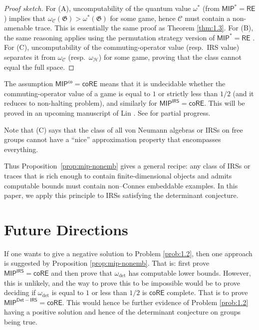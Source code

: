 \documentclass[pdflatex,sn-mathphys-num]{sn-jnl}%
\begin{document}
\begin{proof}[Proof sketch]
For (A), uncomputability of the quantum value $\omega^*$ (from $\mathsf{MIP}^*=\mathsf{RE}$\cite{ji_mipre_2022}) implies that $\omega_\mathcal{C}(\mathfrak{G})>\omega^*(\mathfrak{G})$ for some game, hence $\mathcal{C}$ must contain a non-amenable trace. This is essentially the same proof as Theorem \ref{thm:1.3}. 
For (B), the same reasoning applies using the permutation strategy version of $\mathsf{MIP}^*=\mathsf{RE}$ \cite{bowen_aldous--lyons_2024}.  
For (C), uncomputability of the commuting-operator value (resp.\ IRS value) separates it from $\omega_\mathcal{C}$ (resp.\ $\omega_\mathcal{H}$) for some game, proving that the class cannot equal the full space.
\end{proof}

The assumption $\mathsf{MIP}^{\mathsf{co}}=\mathsf{coRE}$ means that it is undecidable whether the commuting-operator value of a game is equal to $1$ or strictly less than $1/2$ (and it reduces to non-halting problem), and similarly for $\mathsf{MIP}^{\mathsf{IRS}}=\mathsf{coRE}$. This will be proved in an upcoming manuscript of Lin \cite{lin_mipco_2025}. See \cite{lin_tracial_2024} for partial progress.

Note that (C) says that the class of all von Neumann algebras or IRSs on free groups cannot have a ``nice'' approximation property that encompasses everything.

Thus Proposition~\ref{prop:mip-nonemb} gives a general recipe: any class of IRSs or traces that is rich enough to contain finite-dimensional objects and admits computable bounds must contain non–Connes embeddable examples. In this paper, we apply this principle to IRSs satisfying the determinant conjecture.

\section{Future Directions}\label{sec:4}

If one wants to give a negative solution to Problem \ref{prob:1.2}, then one approach is suggested by Proposition \ref{prop:mip-nonemb}. That is: first prove $\mathsf{MIP}^{\mathsf{IRS}}=\mathsf{coRE}$ and then prove that $\omega_{\mathrm{det}}$ has computable lower bounds. However, this is unlikely, and the way to prove this to be impossible would be to prove deciding if $\omega_{\mathrm{det}}$ is equal to $1$ or less than $1/2$ is $\mathsf{coRE}$ complete. That is to prove $\mathsf{MIP}^{\mathsf{Det-IRS}}=\mathsf{coRE}$. This would hence be further evidence of Problem \ref{prob:1.2} having a positive solution and hence of the determinant conjecture on groups being true.
\end{document}
